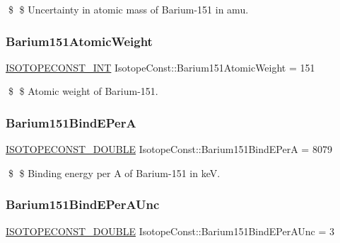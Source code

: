 \$ \$ Uncertainty in atomic mass of Barium-\/151 in amu. \mbox{\label{group___isotope_const-_barium-_ba151_ga5cfd2178725355ea6951ecda7c7802dd}} 
\subsubsection{\texorpdfstring{Barium151\+Atomic\+Weight}{Barium151AtomicWeight}}
{\footnotesize\ttfamily \mbox{\hyperlink{group___isotope_const-_macros_ga5f18360b3e99483a35c32d789e62621c}{I\+S\+O\+T\+O\+P\+E\+C\+O\+N\+S\+T\+\_\+\+I\+NT}} Isotope\+Const\+::\+Barium151\+Atomic\+Weight = 151}

\$ \$ Atomic weight of Barium-\/151. \mbox{\label{group___isotope_const-_barium-_ba151_ga2d6ede88d186a9728b91ce62cac93684}} 
\subsubsection{\texorpdfstring{Barium151\+Bind\+E\+PerA}{Barium151BindEPerA}}
{\footnotesize\ttfamily \mbox{\hyperlink{group___isotope_const-_macros_ga8f45a7272ce02c0b4c65c44636ed719a}{I\+S\+O\+T\+O\+P\+E\+C\+O\+N\+S\+T\+\_\+\+D\+O\+U\+B\+LE}} Isotope\+Const\+::\+Barium151\+Bind\+E\+PerA = 8079}

\$ \$ Binding energy per A of Barium-\/151 in keV. \mbox{\label{group___isotope_const-_barium-_ba151_ga1f89a31cb99b8e056f73b280551b37f4}} 
\subsubsection{\texorpdfstring{Barium151\+Bind\+E\+Per\+A\+Unc}{Barium151BindEPerAUnc}}
{\footnotesize\ttfamily \mbox{\hyperlink{group___isotope_const-_macros_ga8f45a7272ce02c0b4c65c44636ed719a}{I\+S\+O\+T\+O\+P\+E\+C\+O\+N\+S\+T\+\_\+\+D\+O\+U\+B\+LE}} Isotope\+Const\+::\+Barium151\+Bind\+E\+Per\+A\+Unc = 3}


